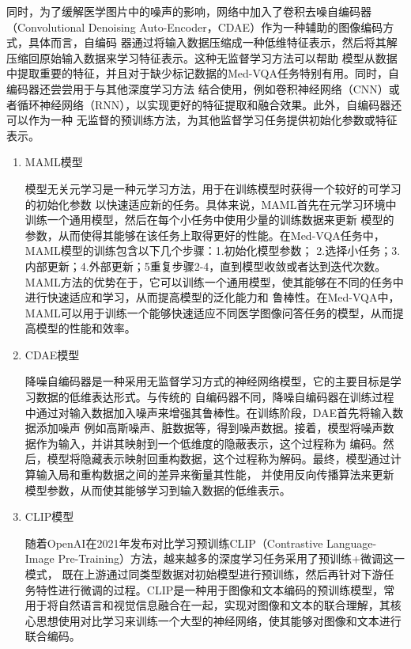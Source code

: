 同时，为了缓解医学图片中的噪声的影响，网络中加入了卷积去噪自编码器（Convolutional Denoising Auto-Encoder，CDAE）\cite{masci2011stacked}作为一种辅助的图像编码方式，具体而言，自编码
器通过将输入数据压缩成一种低维特征表示，然后将其解压缩回原始输入数据来学习特征表示。这种无监督学习方法可以帮助
模型从数据中提取重要的特征，并且对于缺少标记数据的Med-VQA任务特别有用。同时，自编码器还尝尝用于与其他深度学习方法
结合使用，例如卷积神经网络（CNN）或者循环神经网络（RNN），以实现更好的特征提取和融合效果。此外，自编码器还可以作为一种
无监督的预训练方法，为其他监督学习任务提供初始化参数或特征表示。
% 
\begin{enumerate}[topsep = 0 pt, itemsep= 0 pt, parsep=0pt, partopsep=0pt, leftmargin=0pt, itemindent=44pt, labelsep=6pt, listparindent=22pt, label=(\arabic*)]
	\item MAML模型
	
	模型无关元学习是一种元学习方法，用于在训练模型时获得一个较好的可学习的初始化参数
	以快速适应新的任务。具体来说，MAML首先在元学习环境中训练一个通用模型，然后在每个小任务中使用少量的训练数据来更新
	模型的参数，从而使得其能够在该任务上取得更好的性能。在Med-VQA任务中，MAML模型的训练包含以下几个步骤：1.初始化模型参数；
	2.选择小任务；3.内部更新；4.外部更新；5重复步骤2-4，直到模型收敛或者达到迭代次数。MAML方法的优势在于，它可以训练一个通用模型，使其能够在不同的任务中进行快速适应和学习，从而提高模型的泛化能力和
	鲁棒性。在Med-VQA中，MAML可以用于训练一个能够快速适应不同医学图像问答任务的模型，从而提高模型的性能和效率。
	\item CDAE模型
	
	降噪自编码器是一种采用无监督学习方式的神经网络模型，它的主要目标是学习数据的低维表达形式。与传统的
	自编码器不同，降噪自编码器在训练过程中通过对输入数据加入噪声来增强其鲁棒性。在训练阶段，DAE首先将输入数据添加噪声
	例如高斯噪声、脏数据等，得到噪声数据。接着，模型将噪声数据作为输入，并讲其映射到一个低维度的隐蔽表示，这个过程称为
	编码。然后，模型将隐藏表示映射回重构数据，这个过程称为解码。最终，模型通过计算输入局和重构数据之间的差异来衡量其性能，
	并使用反向传播算法来更新模型参数，从而使其能够学习到输入数据的低维表示。
	\item CLIP模型
	
	随着OpenAI在2021年发布对比学习预训练CLIP\cite{radford2021learning}（Contrastive Language-Image Pre-Training）方法，越来越多的深度学习任务采用了预训练+微调这一模式，
	既在上游通过同类型数据对初始模型进行预训练，然后再针对下游任务特性进行微调的过程。CLIP是一种用于图像和文本编码的预训练模型，常用于将自然语言和视觉信息融合在一起，实现对图像和文本的联合理解，其核心思想使用对比学习来训练一个大型的神经网络，使其能够对图像和文本进行联合编码。
\end{enumerate}

